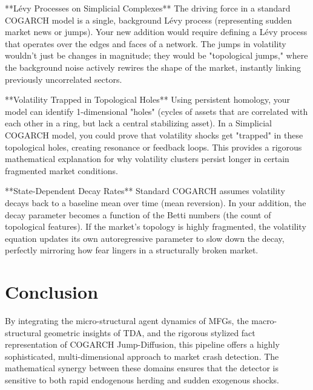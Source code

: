 \documentclass[11pt, a4paper]{article}
\begin{document}
**Lévy Processes on Simplicial Complexes**
The driving force in a standard COGARCH model is a single, background Lévy process (representing sudden market news or jumps). Your new addition would require defining a Lévy process that operates over the edges and faces of a network. The jumps in volatility wouldn't just be changes in magnitude; they would be "topological jumps," where the background noise actively rewires the shape of the market, instantly linking previously uncorrelated sectors.

**Volatility Trapped in Topological Holes**
Using persistent homology, your model can identify 1-dimensional "holes" (cycles of assets that are correlated with each other in a ring, but lack a central stabilizing asset). In a Simplicial COGARCH model, you could prove that volatility shocks get "trapped" in these topological holes, creating resonance or feedback loops. This provides a rigorous mathematical explanation for why volatility clusters persist longer in certain fragmented market conditions.

**State-Dependent Decay Rates**
Standard COGARCH assumes volatility decays back to a baseline mean over time (mean reversion). In your addition, the decay parameter becomes a function of the Betti numbers (the count of topological features). If the market's topology is highly fragmented, the volatility equation updates its own autoregressive parameter to slow down the decay, perfectly mirroring how fear lingers in a structurally broken market.
\section{Conclusion}
By integrating the micro-structural agent dynamics of MFGs, the macro-structural geometric insights of TDA, and the rigorous stylized fact representation of COGARCH Jump-Diffusion, this pipeline offers a highly sophisticated, multi-dimensional approach to market crash detection. The mathematical synergy between these domains ensures that the detector is sensitive to both rapid endogenous herding and sudden exogenous shocks.
\end{document}
